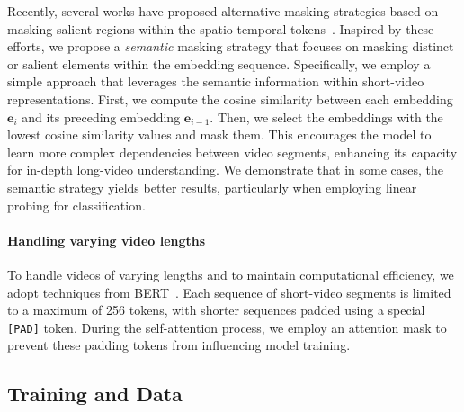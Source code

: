 Recently, several works have proposed alternative masking strategies based on masking salient regions within the spatio-temporal tokens~\cite{Li2022SemMAESM, Fan2023MotionGuidedMF, Huang2023MGMAEMG}. Inspired by these efforts, we propose a \textit{semantic} masking strategy that focuses on masking distinct or salient elements within the embedding sequence. Specifically, we employ a simple approach that leverages the semantic information within short-video representations. First, we compute the cosine similarity between each embedding $\mathbf{e}_i$ and its preceding embedding $\mathbf{e}_{i-1}$. Then, we select the embeddings with the lowest cosine similarity values and mask them. This encourages the model to learn more complex dependencies between video segments, enhancing its capacity for in-depth long-video understanding. We demonstrate that in some cases, the semantic strategy yields better results, particularly when employing linear probing for classification.


\vspace{-4mm}
\paragraph{Handling varying video lengths}
To handle videos of varying lengths and to maintain computational efficiency, we adopt techniques from BERT~\cite{devlin2019bert}. Each sequence of short-video segments is limited to a maximum of 256 tokens, with shorter sequences padded using a special \texttt{[PAD]} token. During the self-attention process, we employ an attention mask to prevent these padding tokens from influencing model training. 

\subsection{Training and Data} \label{subsec:train_and_data}
